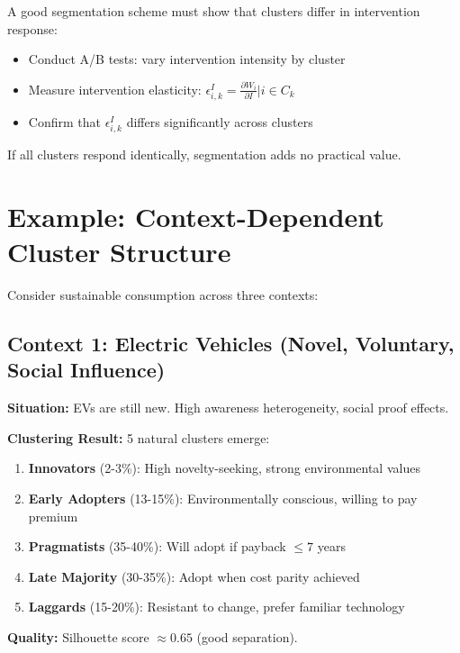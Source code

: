 A good segmentation scheme must show that clusters differ in intervention response:
\begin{itemize}
    \item Conduct A/B tests: vary intervention intensity by cluster
    \item Measure intervention elasticity: $\epsilon_{i,k}^{I} = \frac{\partial W_i}{\partial I} | i \in C_k$
    \item Confirm that $\epsilon_{i,k}^{I}$ differs significantly across clusters
\end{itemize}

If all clusters respond identically, segmentation adds no practical value.

\section{Example: Context-Dependent Cluster Structure}
\label{sec:context-examples}

Consider sustainable consumption across three contexts:

\subsection{Context 1: Electric Vehicles (Novel, Voluntary, Social Influence)}

\textbf{Situation:} EVs are still new. High awareness heterogeneity, social proof effects.

\textbf{Clustering Result:} 5 natural clusters emerge:
\begin{enumerate}
    \item \textbf{Innovators} (2-3\%): High novelty-seeking, strong environmental values
    \item \textbf{Early Adopters} (13-15\%): Environmentally conscious, willing to pay premium
    \item \textbf{Pragmatists} (35-40\%): Will adopt if payback $\leq 7$ years
    \item \textbf{Late Majority} (30-35\%): Adopt when cost parity achieved
    \item \textbf{Laggards} (15-20\%): Resistant to change, prefer familiar technology
\end{enumerate}

\textbf{Quality:} Silhouette score $\approx 0.65$ (good separation).

